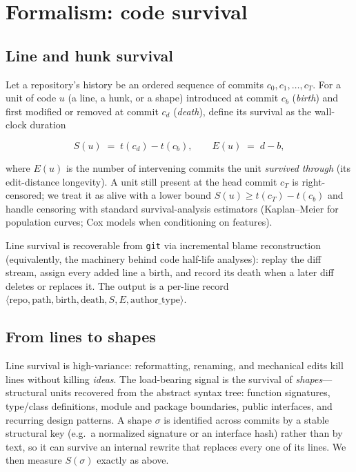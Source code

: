 \documentclass[11pt,letterpaper]{article}
\newcommand{\survival}{\ensuremath{S}}
\newcommand{\shape}{\ensuremath{\sigma}}
\begin{document}
\section{Formalism: code survival}

\subsection{Line and hunk survival}

Let a repository's history be an ordered sequence of commits
$c_0, c_1, \dots, c_T$. For a unit of code $u$ (a line, a hunk, or a shape)
introduced at commit $c_b$ (\emph{birth}) and first modified or removed at
commit $c_d$ (\emph{death}), define its survival as the wall-clock duration

\[
\survival(u) \;=\; t(c_d) - t(c_b),
\qquad
E(u) \;=\; d - b,
\]

where $E(u)$ is the number of intervening commits the unit \emph{survived
through} (its edit-distance longevity). A unit still present at the head commit
$c_T$ is right-censored; we treat it as alive with a lower bound
$\survival(u) \ge t(c_T) - t(c_b)$ and handle censoring with standard
survival-analysis estimators (Kaplan--Meier for population curves; Cox models
when conditioning on features).

Line survival is recoverable from \texttt{git} via incremental blame reconstruction
(equivalently, the machinery behind code half-life analyses): replay the diff
stream, assign every added line a birth, and record its death when a later diff
deletes or replaces it. The output is a per-line record
$\langle \text{repo}, \text{path}, \text{birth}, \text{death}, \survival, E,
\text{author\_type}\rangle$.

\subsection{From lines to shapes}

Line survival is high-variance: reformatting, renaming, and mechanical edits
kill lines without killing \emph{ideas}. The load-bearing signal is the survival
of \emph{shapes}---structural units recovered from the abstract syntax tree:
function signatures, type/class definitions, module and package boundaries,
public interfaces, and recurring design patterns. A shape $\shape$ is identified
across commits by a stable structural key (e.g.\ a normalized signature or an
interface hash) rather than by text, so it can survive an internal rewrite that
replaces every one of its lines. We then measure $\survival(\shape)$ exactly as
above.
\end{document}
